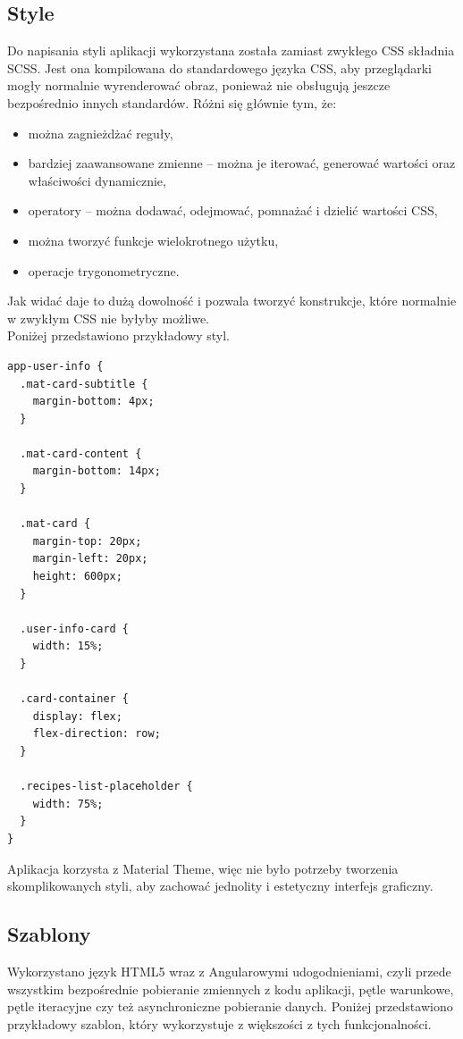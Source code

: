   \subsection{Style}
  Do napisania styli aplikacji wykorzystana została zamiast zwykłego CSS składnia SCSS. Jest ona kompilowana do standardowego języka CSS, aby przeglądarki mogły normalnie wyrenderować obraz, ponieważ nie obsługują jeszcze bezpośrednio innych standardów.\cite{scss} Różni się głównie tym, że:
  \begin{itemize}
      \item można zagnieżdżać reguły,
      \item bardziej zaawansowane zmienne -- można je iterować, generować wartości oraz właściwości dynamicznie,
      \item operatory -- można dodawać, odejmować, pomnażać i dzielić wartości CSS,
      \item można tworzyć funkcje wielokrotnego użytku,
      \item operacje trygonometryczne.
  \end{itemize}
  Jak widać daje to dużą dowolność i pozwala tworzyć konstrukcje, które normalnie w zwykłym CSS nie byłyby możliwe.\\
  Poniżej przedstawiono przykładowy styl.
  \begin{lstlisting}
app-user-info {
  .mat-card-subtitle {
    margin-bottom: 4px;
  }

  .mat-card-content {
    margin-bottom: 14px;
  }

  .mat-card {
    margin-top: 20px;
    margin-left: 20px;
    height: 600px;
  }

  .user-info-card {
    width: 15%;
  }

  .card-container {
    display: flex;
    flex-direction: row;
  }

  .recipes-list-placeholder {
    width: 75%;
  }
}
  \end{lstlisting}
  Aplikacja korzysta z Material Theme, więc nie było potrzeby tworzenia skomplikowanych styli, aby zachować jednolity i estetyczny interfejs graficzny.
  \subsection{Szablony}
  Wykorzystano język HTML5 wraz z Angularowymi udogodnieniami, czyli przede wszystkim bezpośrednie pobieranie zmiennych z kodu aplikacji, pętle warunkowe, pętle iteracyjne czy też asynchroniczne pobieranie danych. Poniżej przedstawiono przykładowy szablon, który wykorzystuje z większości z tych funkcjonalności.
  
